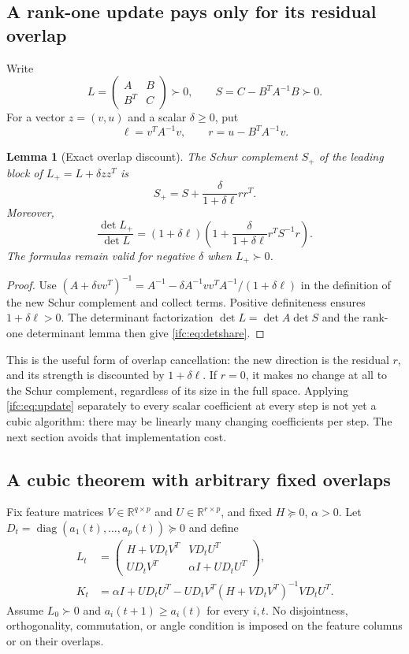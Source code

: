 \documentclass[11pt]{amsart}
\newtheorem{lemma}[theorem]{Lemma}
\theoremstyle{definition}\newtheorem{definition}[theorem]{Definition}
\theoremstyle{remark}\newtheorem{remark}[theorem]{Remark}
\numberwithin{equation}{section}
\newcommand{\R}{\mathbb R}
\newcommand{\diag}{\operatorname{diag}}
\begin{document}
\subsection{A rank-one update pays only for its residual overlap}
Write
\[
 L=\begin{pmatrix} A&B\\ B^T&C\end{pmatrix}\succ0,
 \qquad S=C-B^TA^{-1}B\succ0.
\]
For a vector $z=(v,u)$ and a scalar $\delta\ge0$, put
\[
 \ell=v^TA^{-1}v,\qquad r=u-B^TA^{-1}v.
\]
\begin{lemma}[Exact overlap discount]\label{ifc:lem:update}
The Schur complement $S_+$ of the leading block of
$L_+=L+\delta zz^T$ is
\begin{equation}\label{ifc:eq:update}
 S_+=S+\frac{\delta}{1+\delta\ell}rr^T.
\end{equation}
Moreover,
\begin{equation}\label{ifc:eq:detshare}
 \frac{\det L_+}{\det L}
 =(1+\delta\ell)
 \left(1+\frac{\delta}{1+\delta\ell}r^TS^{-1}r\right).
\end{equation}
The formulas remain valid for negative $\delta$ when $L_+\succ0$.
\end{lemma}
\begin{proof}
Use
$(A+\delta vv^T)^{-1}
=A^{-1}-\delta A^{-1}vv^TA^{-1}/(1+\delta\ell)$
in the definition of the new Schur complement and collect terms.
Positive definiteness ensures $1+\delta\ell>0$. The determinant
factorization $\det L=\det A\det S$ and the rank-one determinant
lemma then give \eqref{ifc:eq:detshare}.
\end{proof}
This is the useful form of overlap cancellation: the new direction is
the residual $r$, and its strength is discounted by $1+\delta\ell$.
If $r=0$, it makes no change at all to the Schur complement, regardless
of its size in the full space. Applying \eqref{ifc:eq:update} separately
to every scalar coefficient at every step is not yet a cubic algorithm:
there may be linearly many changing coefficients per step. The next
section avoids that implementation cost.

\subsection{A cubic theorem with arbitrary fixed overlaps}
Fix feature matrices $V\in\R^{q\times p}$ and $U\in\R^{r\times p}$,
and fixed $H\succeq0$, $\alpha>0$. Let
$D_t=\diag(a_1(t),\ldots,a_p(t))\succeq0$ and define
\begin{align}
 L_t&=\begin{pmatrix}
 H+VD_tV^T&VD_tU^T\\
 UD_tV^T&\alpha I+UD_tU^T
 \end{pmatrix},\label{ifc:eq:lift}\\
 K_t&=\alpha I+UD_tU^T
 -UD_tV^T(H+VD_tV^T)^{-1}VD_tU^T.\label{ifc:eq:short}
\end{align}
Assume $L_0\succ0$ and $a_i(t+1)\ge a_i(t)$ for every $i,t$.
No disjointness, orthogonality, commutation, or angle condition is imposed
on the feature columns or on their overlaps.
\end{document}
